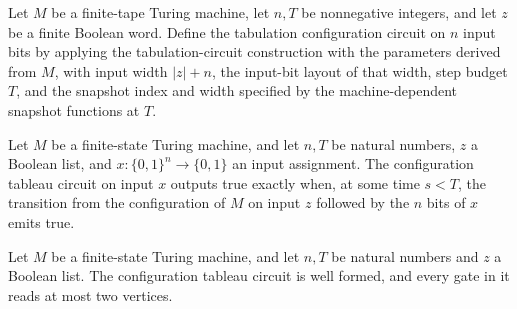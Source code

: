 \begin{definition}
\label{Complexity.cfgTab}
\leanok
{}
Let $M$ be a finite-tape Turing machine, let $n,T$ be nonnegative integers, and let $z$
be a finite Boolean word. Define the tabulation configuration circuit on $n$ input bits
by applying the tabulation-circuit construction with the parameters derived from $M$,
with input width $|z|+n$, the input-bit layout of that width, step budget $T$, and the
snapshot index and width specified by the machine-dependent snapshot functions at $T$.
\end{definition}

\begin{theorem}
\label{Complexity.cfgTab_eval}
\leanok
{}
Let $M$ be a finite-state Turing machine, and let $n,T$ be natural numbers, $z$ a
Boolean list, and $x:\{0,1\}^n\to\{0,1\}$ an input assignment. The configuration tableau
circuit on input $x$ outputs true exactly when, at some time $s<T$, the transition from
the configuration of $M$ on input $z$ followed by the $n$ bits of $x$ emits true.
\end{theorem}

\begin{theorem}
\label{Complexity.cfgTab_isFaninTwo}
\leanok
{}
Let $M$ be a finite-state Turing machine, and let $n,T$ be natural numbers and $z$ a
Boolean list. The configuration tableau circuit is well formed, and every gate in it
reads at most two vertices.
\end{theorem}

